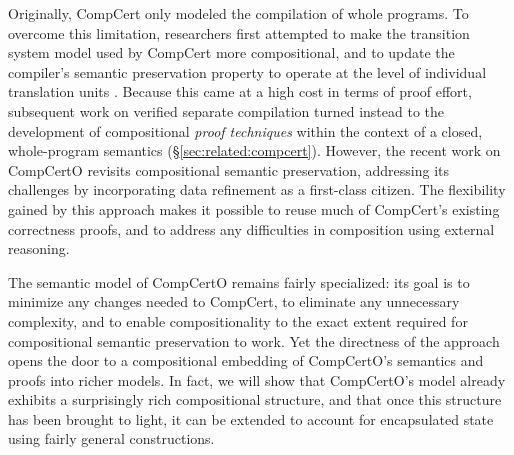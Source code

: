 \documentclass[acmsmall,screen,review,anonymous]{acmart}
\begin{document}
Originally,
CompCert
only modeled the compilation of whole programs.
To overcome this limitation,
researchers first attempted to make
the transition system model used by CompCert
more compositional,
and to update the compiler's semantic preservation property
to operate at the level of individual translation units
\cite{compcompcert}.
Because
this came at a high cost in terms of proof effort,
subsequent work on verified separate compilation
turned instead to the development of compositional
\emph{proof techniques}
within the context of a closed, whole-program semantics
(\S\ref{sec:related:compcert}).
However,
the recent work on CompCertO \cite{compcerto}
revisits compositional semantic preservation,
addressing its challenges
by incorporating data refinement
as a first-class citizen.
The flexibility
gained by this approach
makes it possible %
to reuse much of CompCert's existing
correctness proofs,
and to address any difficulties in composition
using external reasoning.

The semantic model of CompCertO
remains fairly specialized:
its goal is to minimize any changes needed to CompCert,
to eliminate any unnecessary complexity,
and to enable compositionality
to the exact extent required
for compositional semantic preservation to work.
%
Yet
the directness of the approach
opens the door to
a compositional embedding
of CompCertO's semantics and proofs
into richer models.
In fact,
we will show that CompCertO's model
already exhibits a surprisingly rich compositional structure,
and that once this structure has been brought to light,
it can be extended to account for encapsulated state
using fairly general constructions.
\end{document}
